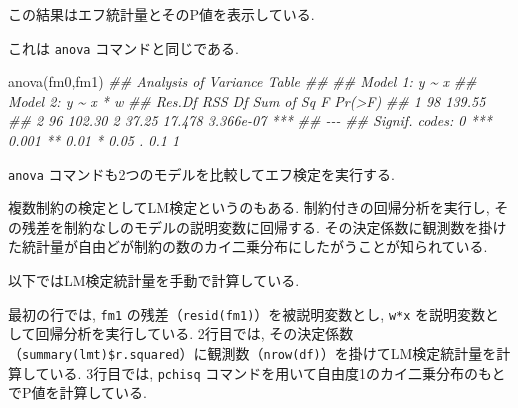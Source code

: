 \documentclass[
  letterpaper,
  xelatex,
  ja=standard, xelatex]{bxjsbook}
\newenvironment{Shaded}{\begin{snugshade}}{\end{snugshade}}
\newcommand{\AttributeTok}[1]{\textcolor[rgb]{0.40,0.45,0.13}{#1}}
\newcommand{\DecValTok}[1]{\textcolor[rgb]{0.68,0.00,0.00}{#1}}
\newcommand{\DocumentationTok}[1]{\textcolor[rgb]{0.37,0.37,0.37}{\textit{#1}}}
\newcommand{\FunctionTok}[1]{\textcolor[rgb]{0.28,0.35,0.67}{#1}}
\newcommand{\NormalTok}[1]{\textcolor[rgb]{0.00,0.23,0.31}{#1}}
\newcommand{\OtherTok}[1]{\textcolor[rgb]{0.00,0.23,0.31}{#1}}
\newcommand{\SpecialCharTok}[1]{\textcolor[rgb]{0.37,0.37,0.37}{#1}}
\begin{document}
この結果はエフ統計量とそのP値を表示している.

これは \texttt{anova} コマンドと同じである.

\begin{Shaded}
\begin{Highlighting}[]
\FunctionTok{anova}\NormalTok{(fm0,fm1)}
\DocumentationTok{\#\# Analysis of Variance Table}
\DocumentationTok{\#\# }
\DocumentationTok{\#\# Model 1: y \textasciitilde{} x}
\DocumentationTok{\#\# Model 2: y \textasciitilde{} x * w}
\DocumentationTok{\#\#   Res.Df    RSS Df Sum of Sq      F    Pr(\textgreater{}F)    }
\DocumentationTok{\#\# 1     98 139.55                                  }
\DocumentationTok{\#\# 2     96 102.30  2     37.25 17.478 3.366e{-}07 ***}
\DocumentationTok{\#\# {-}{-}{-}}
\DocumentationTok{\#\# Signif. codes:  0 \textquotesingle{}***\textquotesingle{} 0.001 \textquotesingle{}**\textquotesingle{} 0.01 \textquotesingle{}*\textquotesingle{} 0.05 \textquotesingle{}.\textquotesingle{} 0.1 \textquotesingle{} \textquotesingle{} 1}
\end{Highlighting}
\end{Shaded}

\texttt{anova} コマンドも2つのモデルを比較してエフ検定を実行する.

複数制約の検定としてLM検定というのもある. 制約付きの回帰分析を実行し,
その残差を制約なしのモデルの説明変数に回帰する.
その決定係数に観測数を掛けた統計量が自由どが制約の数のカイ二乗分布にしたがうことが知られている.

以下ではLM検定統計量を手動で計算している.

\begin{Shaded}
\end{Shaded}

最初の行では, \texttt{fm1}
の残差（\texttt{resid(fm1)}）を被説明変数とし, \texttt{w*x}
を説明変数として回帰分析を実行している. 2行目では,
その決定係数（\texttt{summary(lmt)\$r.squared}）に観測数（\texttt{nrow(df)}）を掛けてLM検定統計量を計算している.
3行目では, \texttt{pchisq}
コマンドを用いて自由度1のカイ二乗分布のもとでP値を計算している.
\end{document}
